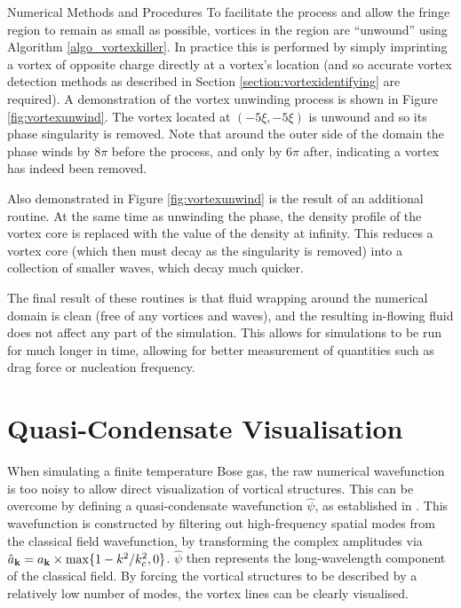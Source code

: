 \begin{chapter}{\label{cha:numerics}Numerical Methods and Procedures}
To facilitate the process and allow the fringe region to remain as small as possible, vortices in the region are ``unwound'' using Algorithm \ref{algo_vortexkiller}. In practice this is performed by simply imprinting a vortex of opposite charge directly at a vortex's location (and so accurate vortex detection methods as described in Section \ref{section:vortexidentifying} are required). A demonstration of the vortex unwinding process is shown in Figure \ref{fig:vortexunwind}. The vortex located at $(-5\xi,-5\xi)$ is unwound and so its phase singularity is removed. Note that around the outer side of the domain the phase winds by $8\pi$ before the process, and only by $6\pi$ after, indicating a vortex has indeed been removed.

Also demonstrated in Figure \ref{fig:vortexunwind} is the result of an additional routine. At the same time as unwinding the phase, the density profile of the vortex core is replaced with the value of the density at infinity. This reduces a vortex core (which then must decay as the singularity is removed) into a collection of smaller waves, which decay much quicker.

The final result of these routines is that fluid wrapping around the numerical domain is clean (free of any vortices and waves), and the resulting in-flowing fluid does not affect any part of the simulation. This allows for simulations to be run for much longer in time, allowing for better measurement of quantities such as drag force or nucleation frequency.

\section{\label{section:quasi-condensate} Quasi-Condensate Visualisation}
When simulating a finite temperature Bose gas, the raw numerical wavefunction is too noisy to allow direct visualization of vortical structures. This can be overcome by defining a quasi-condensate wavefunction $\hat{\psi}$, as established in \cite{PhysRevA.66.013603}. This wavefunction is constructed by filtering out high-frequency spatial modes from the classical field wavefunction, by 
transforming the complex amplitudes via
$\hat{a}_{{\bf k}} = a_{{\bf k}}\times\max\{1-k^{2}/k_c^2,0\}$. $\hat{\psi}$ then represents the long-wavelength component of the classical field. By forcing the vortical structures to be described by a relatively low number of modes, the vortex lines can be clearly visualised.


\end{chapter}
